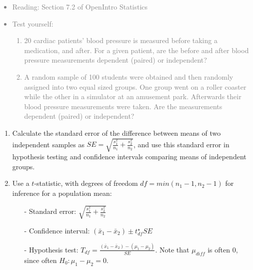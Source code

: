 \documentclass[11pt]{article}
\newcommand{\gray}[1]{\textcolor{gray}{#1}}
\begin{document}
\gray{
{\it
\vspace{-0.55cm}
\begin{itemize}
\renewcommand{\labelitemi}{{\textcolor{dark}{$\ast$}}}
\item Reading: Section 7.2 of OpenIntro Statistics
\item Test yourself:
\begin{enumerate}
\item 20 cardiac patients' blood pressure is measured before taking a medication, and after. For a given patient, are the before and after blood pressure measurements dependent (paired) or independent?
\item A random sample of 100 students were obtained and then randomly assigned into two equal sized groups. One group went on a roller coaster while the other in a simulator at an amusement park. Afterwards their blood pressure measurements were taken. Are the measurements dependent (paired) or independent?
\end{enumerate}
\end{itemize}
}}

%

\vspace{0.48cm}

%

\begin{enumerate}[resume]
\renewcommand\labelenumi{\textcolor{light}{\textbf{LO \theenumi.}}}

\item Calculate the standard error of the difference between means of two independent samples as $SE = \sqrt{\frac{s_1^2}{n_1} + \frac{s_2^2}{n_2}}$, and use this standard error in hypothesis testing and confidence intervals comparing means of independent groups.

\item Use a $t$-statistic, with degrees of freedom $df = min(n_1 - 1, n_2 - 1)$ for inference for a population mean:
\begin{itemize}
\item[-] Standard error: $\sqrt{\frac{s_1^2}{n_1} + \frac{s_2^2}{n_2}}$
\item[-] Confidence interval: $(\bar{x}_1 - \bar{x}_2) \pm t_{df}^\star SE$
\item[-] Hypothesis test: $T_{df} = \frac{(\bar{x}_1 - \bar{x}_2) - (\mu_1 - \mu_2)}{SE}$. Note that $\mu_{diff}$ is often 0, since often $H_0: \mu_1 - \mu_2 = 0$.
\end{itemize}

\end{enumerate}
\end{document}
